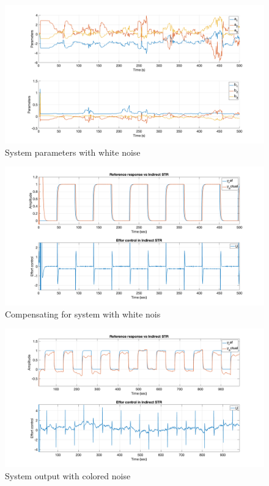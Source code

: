 \begin{figure}
	\centering
	\includegraphics[width=\textwidth]{images/str72.png}
	\caption{System parameters with white noise}
	\label{fig:str72}
\end{figure}

\begin{figure}
	\centering
	\includegraphics[width=\textwidth]{images/str73.png}
	\caption{Compensating for system with white nois}
	\label{fig:str73}
\end{figure}

\begin{figure}
	\centering
	\includegraphics[width=\textwidth]{images/str74.png}
	\caption{System output with colored noise}
	\label{fig:str74}
\end{figure}

